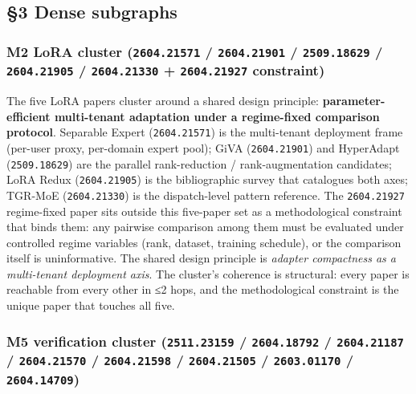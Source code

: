 \documentclass[11pt,letterpaper]{article}
\newcommand{\arxivid}[1]{\texttt{\textcolor{accent}{#1}}}
\begin{document}
\subsection{§3 Dense subgraphs}

\subsubsection{\texorpdfstring{M2 LoRA cluster (\arxivid{2604.21571} /
\arxivid{2604.21901} / \arxivid{2509.18629} / \arxivid{2604.21905} /
\arxivid{2604.21330} + \arxivid{2604.21927}
constraint)}{M2 LoRA cluster (\arxivid{2604.21571} / \arxivid{2604.21901} / \arxivid{2509.18629} / \arxivid{2604.21905} / \arxivid{2604.21330} + \arxivid{2604.21927} constraint)}}

The five LoRA papers cluster around a shared design principle:
\textbf{parameter-efficient multi-tenant adaptation under a regime-fixed
comparison protocol}. Separable Expert (\arxivid{2604.21571}) is the
multi-tenant deployment frame (per-user proxy, per-domain expert pool);
GiVA (\arxivid{2604.21901}) and HyperAdapt (\arxivid{2509.18629}) are the
parallel rank-reduction / rank-augmentation candidates; LoRA Redux
(\arxivid{2604.21905}) is the bibliographic survey that catalogues both
axes; TGR-MoE (\arxivid{2604.21330}) is the dispatch-level pattern
reference. The \arxivid{2604.21927} regime-fixed paper sits outside this
five-paper set as a methodological constraint that binds them: any
pairwise comparison among them must be evaluated under controlled regime
variables (rank, dataset, training schedule), or the comparison itself
is uninformative. The shared design principle is \emph{adapter
compactness as a multi-tenant deployment axis}. The cluster's coherence
is structural: every paper is reachable from every other in ≤2 hops, and
the methodological constraint is the unique paper that touches all five.

\subsubsection{\texorpdfstring{M5 verification cluster
(\arxivid{2511.23159} / \arxivid{2604.18792} / \arxivid{2604.21187} /
\arxivid{2604.21570} / \arxivid{2604.21598} / \arxivid{2604.21505} /
\arxivid{2603.01170} /
\arxivid{2604.14709})}{M5 verification cluster (\arxivid{2511.23159} / \arxivid{2604.18792} / \arxivid{2604.21187} / \arxivid{2604.21570} / \arxivid{2604.21598} / \arxivid{2604.21505} / \arxivid{2603.01170} / \arxivid{2604.14709})}}
\end{document}
